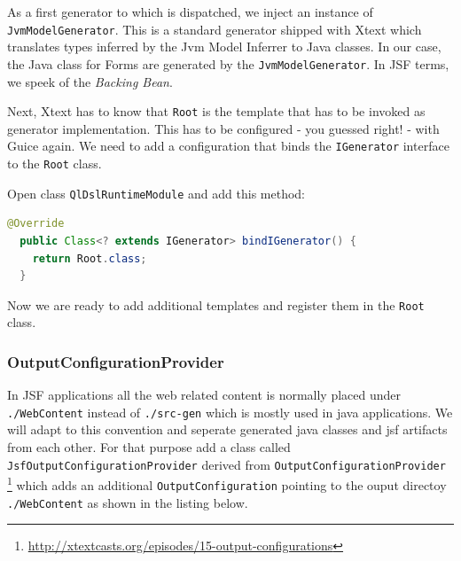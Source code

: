 As a first generator to which is dispatched, we inject an instance of
\texttt{JvmModelGenerator}. This is a standard generator shipped with Xtext which
translates types inferred by the Jvm Model Inferrer to Java classes.
In our case, the Java class for Forms are generated by the
\texttt{JvmModelGenerator}. In JSF terms, we speek of the \emph{Backing Bean}.
 
Next, Xtext has to know that \texttt{Root} is the template that has to be invoked
as generator implementation. This has to be configured - you guessed right! - 
with Guice again. We need to add a configuration that binds the \texttt{IGenerator}
interface to the \texttt{Root} class.

Open class \texttt{QlDslRuntimeModule} and add this method:

\begin{lstlisting}[language=Java]
  @Override
  public Class<? extends IGenerator> bindIGenerator() {
    return Root.class;
  }
\end{lstlisting}

Now we are ready to add additional templates and register them in the
\texttt{Root} class.

\subsubsection{OutputConfigurationProvider}
\label{sec:outputConfigurationProvider}

In JSF applications all the web related content is normally placed under
\texttt{./WebContent} instead of \texttt{./src-gen} which is mostly used in
java applications. We will adapt to this convention and seperate generated java
classes and jsf artifacts from each other. For that purpose add a class called
\texttt{JsfOutputConfigurationProvider} derived from
\texttt{OutputConfigurationProvider}
\footnote{\url{http://xtextcasts.org/episodes/15-output-configurations}} which
adds an additional \texttt{OutputConfiguration} pointing to the ouput directoy
\texttt{./WebContent} as shown in the listing below.

